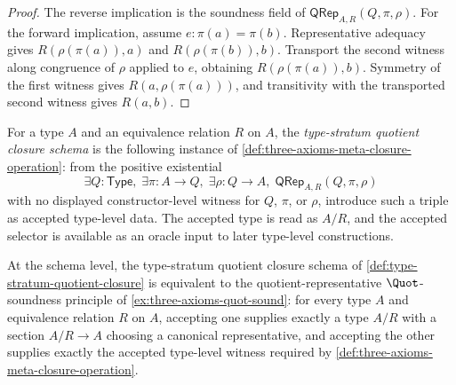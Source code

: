 \begin{proof}
The reverse implication is the soundness field of $\mathsf{QRep}_{A,R}(Q,\pi,\rho)$. For the forward implication, assume $e:\pi(a)=\pi(b)$. Representative adequacy gives $R(\rho(\pi(a)),a)$ and $R(\rho(\pi(b)),b)$. Transport the second witness along congruence of $\rho$ applied to $e$, obtaining $R(\rho(\pi(a)),b)$. Symmetry of the first witness gives $R(a,\rho(\pi(a)))$, and transitivity with the transported second witness gives $R(a,b)$.
\end{proof}

\begin{definition}
\label{def:type-stratum-quotient-closure}
For a type $A$ and an equivalence relation $R$ on $A$, the \emph{type-stratum quotient closure schema} is the following instance of \autoref{def:three-axioms-meta-closure-operation}: from the positive existential
$$
\exists Q:\mathsf{Type},\;\exists \pi:A\to Q,\;\exists \rho:Q\to A,\;\mathsf{QRep}_{A,R}(Q,\pi,\rho)
$$
with no displayed constructor-level witness for $Q$, $\pi$, or $\rho$, introduce such a triple as accepted type-level data. The accepted type is read as $A/R$, and the accepted selector is available as an oracle input to later type-level constructions.
\end{definition}

\begin{theorem}
\label{thm:quot-sound-type-stratum-meta-closure}
At the schema level, the type-stratum quotient closure schema of \autoref{def:type-stratum-quotient-closure} is equivalent to the quotient-representative $\Quot$-soundness principle of \autoref{ex:three-axioms-quot-sound}: for every type $A$ and equivalence relation $R$ on $A$, accepting one supplies exactly a type $A/R$ with a section $A/R\to A$ choosing a canonical representative, and accepting the other supplies exactly the accepted type-level witness required by \autoref{def:three-axioms-meta-closure-operation}.
\end{theorem}

